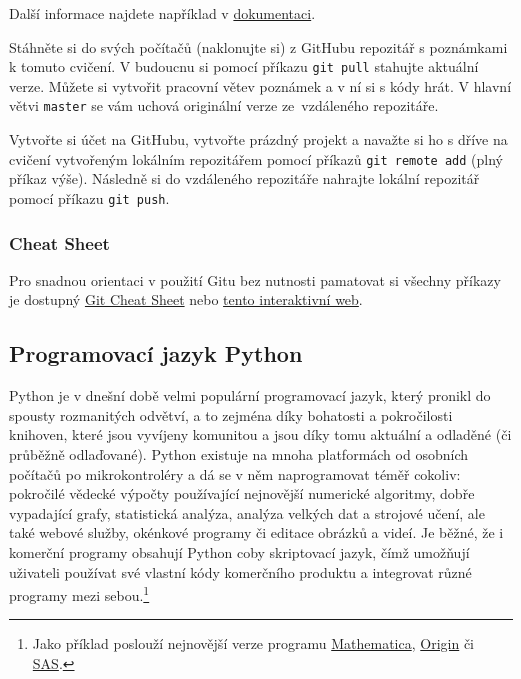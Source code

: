 \documentclass[a4paper,11pt,twoside]{article}
\def\code#1{\textnormal{\texttt{#1}}}
\theoremstyle{red}
\theoremstyle{green}
\begin{document}
    Další informace najdete například v \href{https://git-scm.com/book/cs/v2/Z%C3%A1klady-pr%C3%A1ce-se-syst%C3%A9mem-Git-Pr%C3%A1ce-se-vzd%C3%A1len%C3%BDmi-repozit%C3%A1%C5%99i}{dokumentaci}.

    \begin{task}
        Stáhněte si do svých počítačů (naklonujte si) z GitHubu repozitář s poznámkami k tomuto cvičení.
        V budoucnu si pomocí příkazu \code{git pull} stahujte aktuální verze.
        Můžete si vytvořit pracovní větev poznámek a v ní si s kódy hrát.
        V hlavní větvi \code{master} se vám uchová originální verze ze~vzdáleného repozitáře.
    \end{task}

    \begin{task}
        Vytvořte si účet na GitHubu, vytvořte prázdný projekt a navažte si ho s dříve na cvičení vytvořeným lokálním repozitářem pomocí příkazů \code{git remote add} (plný příkaz výše).
        Následně si do vzdáleného repozitáře nahrajte lokální repozitář pomocí příkazu \code{git push}. 
    \end{task}

\subsubsection{Cheat Sheet}
    Pro snadnou orientaci v použití Gitu bez nutnosti pamatovat si všechny příkazy je dostupný \href{https://training.github.com/downloads/github-git-cheat-sheet.pdf}{Git Cheat Sheet} nebo \href{https://ndpsoftware.com/git-cheatsheet.html}{tento interaktivní web}.

\subsection{Programovací jazyk Python}
    Python je v dnešní době velmi populární programovací jazyk, který pronikl do spousty rozmanitých odvětví, a to zejména díky bohatosti a pokročilosti knihoven, které jsou vyvíjeny komunitou a jsou díky tomu aktuální a odladěné (či průběžně odlaďované).
    Python existuje na mnoha platformách od osobních počítačů po mikrokontroléry a dá se v něm naprogramovat téměř cokoliv: pokročilé vědecké výpočty používající nejnovější numerické algoritmy, dobře vypadající grafy, statistická analýza, analýza velkých dat a strojové učení, ale také webové služby, okénkové programy či editace obrázků a videí.
    Je běžné, že i komerční programy obsahují Python coby skriptovací jazyk, čímž umožňují uživateli používat své vlastní kódy  komerčního produktu a integrovat různé programy mezi sebou.\footnote{
        Jako příklad poslouží nejnovější verze programu \href{https://www.wolfram.com/language/12/external-system-integration/evaluate-python-in-a-notebook.html}{Mathematica}, \href{https://www.originlab.com/doc/python/Run-Python-in-Origin}{Origin} či \href{https://developer.sas.com/guides/python.html}{SAS}.
    }
    
\end{document}
